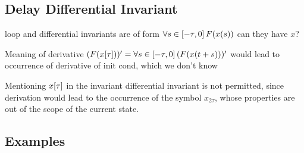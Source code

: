 \documentclass[10pt]{report}
\begin{document}
        \subsection{Delay Differential Invariant}
            \label{sec:delay-differential-invariant}



            loop and differential invariants are of form $\forall s\in[-\tau,0]{\,} F(x(s))$
            can they have $x$?

            Meaning of derivative $(F(\xtau))'=\lforall{s\in[-\tau,0]}{(F(x(t+s)))'}$ would lead to occurrence of derivative of init cond, which we don't know

            Mentioning $\xtau$ in the invariant differential invariant is not permitted, since derivation would lead to the occurrence of the symbol $x_{2\tau}$, whose properties are out of the scope of the current state.

        \subsection{Examples}
            \label{sec:examples}
\end{document}
